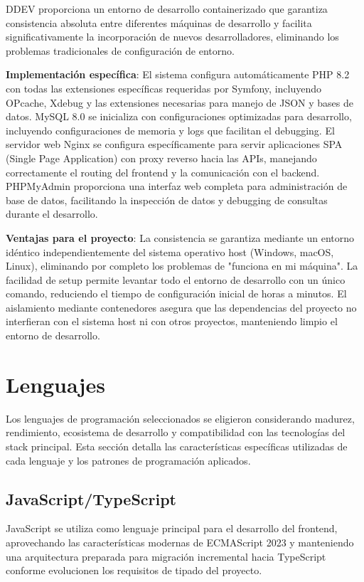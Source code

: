 \documentclass[12pt,a4paper,oneside]{report}
\begin{document}
DDEV proporciona un entorno de desarrollo containerizado que garantiza consistencia absoluta entre diferentes máquinas de desarrollo y facilita significativamente la incorporación de nuevos desarrolladores, eliminando los problemas tradicionales de configuración de entorno.

\textbf{Implementación específica}: El sistema configura automáticamente PHP 8.2 con todas las extensiones específicas requeridas por Symfony, incluyendo OPcache, Xdebug y las extensiones necesarias para manejo de JSON y bases de datos. MySQL 8.0 se inicializa con configuraciones optimizadas para desarrollo, incluyendo configuraciones de memoria y logs que facilitan el debugging. El servidor web Nginx se configura específicamente para servir aplicaciones SPA (Single Page Application) con proxy reverso hacia las APIs, manejando correctamente el routing del frontend y la comunicación con el backend. PHPMyAdmin proporciona una interfaz web completa para administración de base de datos, facilitando la inspección de datos y debugging de consultas durante el desarrollo.

\textbf{Ventajas para el proyecto}: La consistencia se garantiza mediante un entorno idéntico independientemente del sistema operativo host (Windows, macOS, Linux), eliminando por completo los problemas de "funciona en mi máquina". La facilidad de setup permite levantar todo el entorno de desarrollo con un único comando, reduciendo el tiempo de configuración inicial de horas a minutos. El aislamiento mediante contenedores asegura que las dependencias del proyecto no interfieran con el sistema host ni con otros proyectos, manteniendo limpio el entorno de desarrollo.

\section{Lenguajes}\label{lenguajes}

Los lenguajes de programación seleccionados se eligieron considerando madurez, rendimiento, ecosistema de desarrollo y compatibilidad con las tecnologías del stack principal. Esta sección detalla las características específicas utilizadas de cada lenguaje y los patrones de programación aplicados.

\subsection{JavaScript/TypeScript}\label{javascripttypescript}

JavaScript se utiliza como lenguaje principal para el desarrollo del frontend, aprovechando las características modernas de ECMAScript 2023 y manteniendo una arquitectura preparada para migración incremental hacia TypeScript conforme evolucionen los requisitos de tipado del proyecto.
\end{document}
